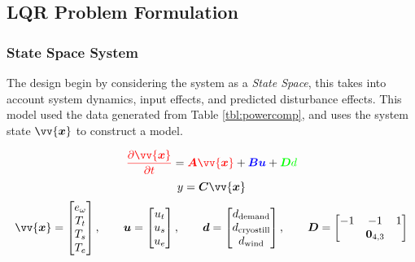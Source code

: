 \subsection{LQR Problem Formulation}

\subsubsection{State Space System}
\label{sec:lqr}

The design begin by considering the system as a \emph{State Space}, this takes into account {\color{red}system dynamics}, {\color{blue}input effects}, and predicted {\color{green}disturbance effects}. This model used the data generated from Table \ref{tbl:powercomp}, and uses the system state $\vv{\bm{x}}$ to construct a model.

    \begin{equation}
            {\color{red} \frac{ \partial \vv{\bm{x}} }{ \partial t } }  = {\color{red} \bm{A} \vv{\bm{x}}} + {\color{blue}\bm{B}{\bm{u}} }+ {\color{green}\bm{D} d}
    \end{equation}
        \begin{equation}
            y = \bm{C} \vv{\bm{x}}
        \end{equation}
        \begin{equation}
                \vv{\bm{x}} =
                \begin{bmatrix}
                        e_{\omega}\\
                        T_{t}\\
                        T_{s}\\
                        T_{e}\\
                \end{bmatrix}
                ,
                \qquad
                \bm{u} =
                \begin{bmatrix}
                        u_t\\
                        u_s\\
                        u_e\\
                \end{bmatrix}
                ,
                \qquad
                \bm{d} =
                \begin{bmatrix}
                        d_{\text{demand}}\\
                        d_{\text{cryostill}}\\
                        d_{\text{wind}}
                \end{bmatrix}
                ,
                \qquad
                \bm{D} =
                \begin{bmatrix}
                        -1 & -1 & 1 \\
                        \, & \bm{0}_{4,3} & \, \\
                \end{bmatrix}
        \end{equation}
